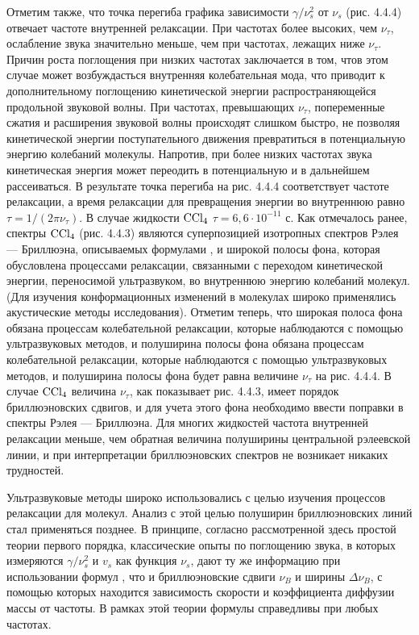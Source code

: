 {Отметим также, что точка перегиба графика зависимости
$\gamma/\nu_s^2$ от $\nu_s$ (рис. 4.4.4) отвечает частоте
внутренней релаксации. При частотах более высоких, чем
$\nu_{\tau}$, ослабление звука значительно меньше, чем при
частотах, лежащих ниже $\nu_{\tau}$. Причин роста поглощения при
низких частотах заключается в том, чтов этом случае может
возбуждасться внутренняя колебательная мода, что приводит к
дополнительному поглощению кинетической энергии
распространяющейся продольной звуковой волны. При частотах,
превышающих $\nu_{\tau}$, попеременные сжатия и расширения
звуковой волны происходят слишком быстро, не позволяя
кинетической энергии поступательного движения превратиться в
потенциальную энергию колебаний молекулы. Напротив, при более
низких частотах звука кинетическая энергия может переодить в
потенциальную и в дальнейшем рассеиваться. В результате точка
перегиба на рис. 4.4.4 соответствует частоте релаксации, а время
релаксации для превращения энергии во внутреннюю равно
$\tau=1/(2\pi\nu_{\tau})$. В случае жидкости $\rm CCl_4$
$\tau=6,6\cdot10^{-11}$ с. Как отмечалось ранее, спектры $\rm
CCl_4$ (рис. 4.4.3) являются суперпозицией изотропных спектров
Рэлея --- Бриллюэна, описываемых формулами , и широкой
полосы фона, которая обусловлена процессами релаксации,
связанными с переходом кинетической энергии, переносимой
ультразвуком, во внутреннюю энергию колебаний молекул. (Для
изучения конформационных изменений в молекулах широко применялись
акустические методы исследования). Отметим теперь, что
широкая полоса фона обязана процессам колебательной релаксации,
которые наблюдаются с помощью ультразвуковых методов, и
полуширина полосы фона обязана процессам колебательной
релаксации, которые наблюдаются с помощью ультразвуковых методов,
и полуширина полосы фона будет равна величине $\nu_{\tau}$ на
рис. 4.4.4. В случае $\rm CCl_4$ величина $\nu_{\tau}$, как
показывает рис. 4.4.3, имеет порядок бриллюэновских сдвигов, и
для учета этого фона необходимо ввести поправки в спектры Рэлея
--- Бриллюэна. Для многих жидкостей частота внутренней релаксации
меньше, чем обратная величина полуширины центральной рэлеевской
линии, и при интерпретации бриллюэновских спектров не возникает
никаких трудностей.

Ультразвуковые методы широко использовались с целью изучения
процессов релаксации для молекул. Анализ с этой целью
полуширин бриллюэновских линий стал применяться позднее. В
принципе, согласно рассмотренной здесь простой теории первого
порядка, классические опыты по поглощению звука, в которых
измеряются $\gamma/\nu_s^2$ и $v_s$ как функция $\nu_s$, дают ту
же информацию при использовании формул , что и
бриллюэновские сдвиги $\nu_B$ и ширины $\Delta\nu_B$,  с помощью
которых находится зависимость скорости и коэффициента диффузии
массы от частоты. В рамках этой теории формулы 
справедливы при любых частотах.

}
